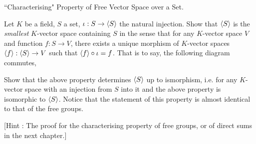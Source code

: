 \documentclass[../../book.tex]{subfiles}
\begin{document}
\begin{ex} \dolater ``Characterising" Property of Free Vector Space over a Set. 

    Let $K$ be a field, $S$ a set, $\iota : S \to \langle S\rangle$ the natural injection.
    Show that $\langle S\rangle$ is the \emph{smallest} $K$-vector space containing $S$
    in the sense that for any $K$-vector space $V$ and function $f : S \to V$, 
    there exists a unique morphism of $K$-vector spaces
    $\langle f\rangle : \langle S\rangle \to V$ such that $\langle f\rangle \circ \iota = f$. 
    That is to say, the following diagram commutes, 
    \begin{figure} [ht]
        \centering
    \end{figure}
    
    Show that the above property determines $\langle S\rangle$ up to ismorphism, i.e.
    for any $K$-vector space with an injection from $S$ into it and the above property
    is isomorphic to $\langle S\rangle$. 
    Notice that the statement of this property is almost
    identical to that of the free groups.
    
    [Hint : The proof for the characterising property of free groups,
    or of direct sums in the next chapter.]
\end{ex}
\end{document}
